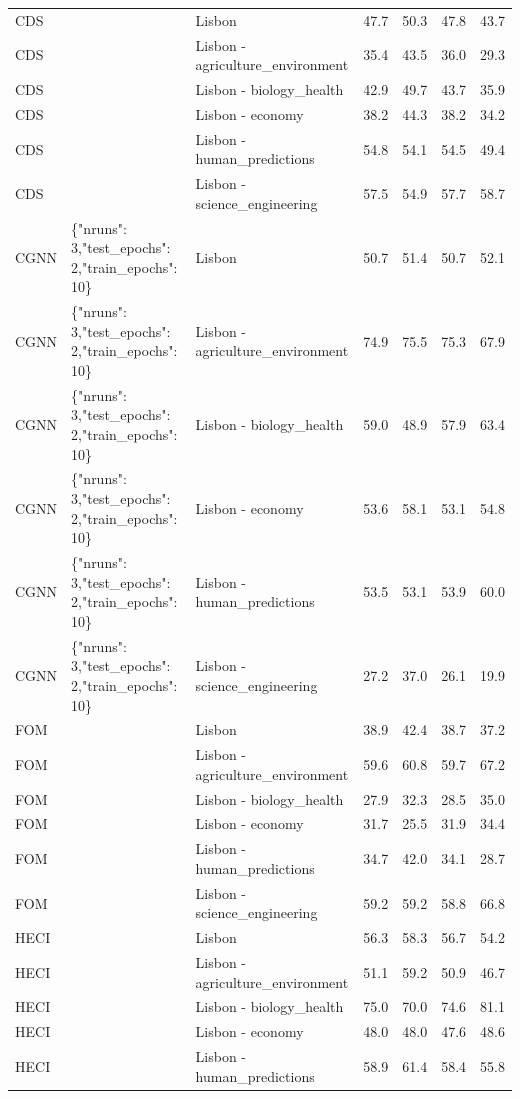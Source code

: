 \begin{tabular}{lllllll}
CDS &  & Lisbon & 47.7 & 50.3 & 47.8 & 43.7 \\
CDS &  & Lisbon - agriculture\_environment & 35.4 & 43.5 & 36.0 & 29.3 \\
CDS &  & Lisbon - biology\_health & 42.9 & 49.7 & 43.7 & 35.9 \\
CDS &  & Lisbon - economy & 38.2 & 44.3 & 38.2 & 34.2 \\
CDS &  & Lisbon - human\_predictions & 54.8 & 54.1 & 54.5 & 49.4 \\
CDS &  & Lisbon - science\_engineering & 57.5 & 54.9 & 57.7 & 58.7 \\
CGNN & \{"nruns": 3,"test\_epochs": 2,"train\_epochs": 10\} & Lisbon & 50.7 & 51.4 & 50.7 & 52.1 \\
CGNN & \{"nruns": 3,"test\_epochs": 2,"train\_epochs": 10\} & Lisbon - agriculture\_environment & 74.9 & 75.5 & 75.3 & 67.9 \\
CGNN & \{"nruns": 3,"test\_epochs": 2,"train\_epochs": 10\} & Lisbon - biology\_health & 59.0 & 48.9 & 57.9 & 63.4 \\
CGNN & \{"nruns": 3,"test\_epochs": 2,"train\_epochs": 10\} & Lisbon - economy & 53.6 & 58.1 & 53.1 & 54.8 \\
CGNN & \{"nruns": 3,"test\_epochs": 2,"train\_epochs": 10\} & Lisbon - human\_predictions & 53.5 & 53.1 & 53.9 & 60.0 \\
CGNN & \{"nruns": 3,"test\_epochs": 2,"train\_epochs": 10\} & Lisbon - science\_engineering & 27.2 & 37.0 & 26.1 & 19.9 \\
FOM &  & Lisbon & 38.9 & 42.4 & 38.7 & 37.2 \\
FOM &  & Lisbon - agriculture\_environment & 59.6 & 60.8 & 59.7 & 67.2 \\
FOM &  & Lisbon - biology\_health & 27.9 & 32.3 & 28.5 & 35.0 \\
FOM &  & Lisbon - economy & 31.7 & 25.5 & 31.9 & 34.4 \\
FOM &  & Lisbon - human\_predictions & 34.7 & 42.0 & 34.1 & 28.7 \\
FOM &  & Lisbon - science\_engineering & 59.2 & 59.2 & 58.8 & 66.8 \\
HECI &  & Lisbon & 56.3 & 58.3 & 56.7 & 54.2 \\
HECI &  & Lisbon - agriculture\_environment & 51.1 & 59.2 & 50.9 & 46.7 \\
HECI &  & Lisbon - biology\_health & 75.0 & 70.0 & 74.6 & 81.1 \\
HECI &  & Lisbon - economy & 48.0 & 48.0 & 47.6 & 48.6 \\
HECI &  & Lisbon - human\_predictions & 58.9 & 61.4 & 58.4 & 55.8 \\

\end{tabular}
